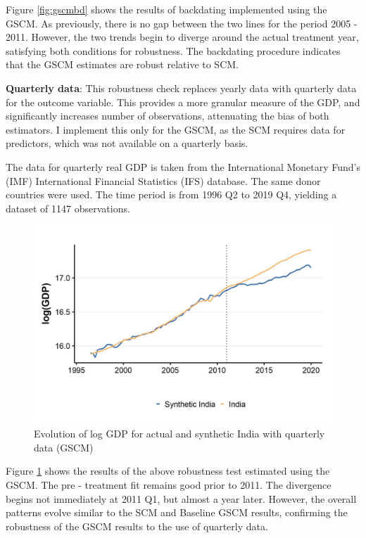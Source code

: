 \documentclass[12pt,nobind, a4paper]{reedthesis}
\begin{document}
 Figure \ref{fig:gscmbd} shows the results of backdating implemented using the GSCM. As previously, there is no gap between the two lines for the period 2005 - 2011. However, the two trends begin to diverge around the actual treatment year, satisfying both conditions for robustness. The backdating procedure indicates that the GSCM estimates are robust relative to SCM.
 \linebreak

 \textbf{Quarterly data}: This robustness check replaces yearly data with quarterly data for the outcome variable. This provides a more granular measure of the GDP, and significantly increases number of observations, attenuating the bias of both estimators. I implement this only for the GSCM, as the SCM requires data for predictors, which was not available on a quarterly basis.
 \linebreak

 The data for quarterly real GDP is taken from the International Monetary Fund's (IMF) International Financial Statistics (IFS) database. The same donor countries were used. The time period is from 1996 Q2 to 2019 Q4, yielding a dataset of 1147 observations.
 \begin{figure}

 {\centering \includegraphics[width=1\linewidth]{figure/indiagsynthqtr} 

 }

 \caption{Evolution of log GDP for actual and synthetic India with quarterly data (GSCM)}\label{fig:gqtr}
 \end{figure}
 Figure \ref{fig:gqtr} shows the results of the above robustness test estimated using the GSCM. The pre - treatment fit remains good prior to 2011. The divergence begins not immediately at 2011 Q1, but almost a year later. However, the overall patterns evolve similar to the SCM and Baseline GSCM results, confirming the robustness of the GSCM results to the use of quarterly data.
 \linebreak
\end{document}
